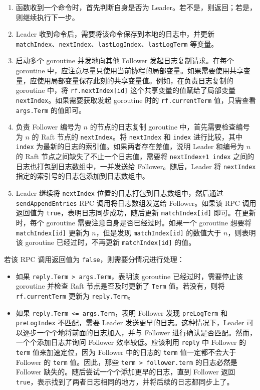 \documentclass[]{article}
\begin{document}
	\begin{enumerate}
		\item 函数收到一个命令时，首先判断自身是否为 Leader。若不是，则返回；若是，则继续执行下一步。
		
		\item Leader 收到命令后，需要将该命令保存到本地的日志中，并更新 \texttt{matchIndex}、\texttt{nextIndex}、\texttt{lastLogIndex}、\texttt{lastLogTerm} 等变量。
		
		\item 启动多个 goroutine 并发地向其他 Follower 发起日志复制请求。在每个 goroutine 中，应注意尽量只使用当前协程的局部变量。如果需要使用共享变量，应使用局部变量保存此刻的共享变量值。例如，在负责日志复制的 goroutine 中，将 \texttt{rf.nextIndex[id]} 这个共享变量的值赋给了局部变量 \texttt{nextIndex}。如果需要获取发起 goroutine 时的 \texttt{rf.currentTerm} 值，只需查看 \texttt{args.Term} 的值即可。
		
		\item 负责 Follower 编号为 $n$ 的节点的日志复制 goroutine 中，首先需要检查编号为 $n$ 的 Raft 节点的 \texttt{nextIndex}。将 \texttt{nextIndex} 和 \texttt{index} 进行比较，其中 \texttt{index} 为最新的日志的索引值。如果两者存在差值，说明 Leader 和编号为 $n$ 的 Raft 节点之间缺失了不止一个日志值，需要将 \texttt{nextIndex+1~index} 之间的日志也打包到日志数组中，一并发送给 Follower。随后，Leader 将 \texttt{nextIndex} 指定的索引号的日志包添加到日志数组中。
		
		\item Leader 继续将 \texttt{nextIndex} 位置的日志打包到日志数组中，然后通过 \texttt{sendAppendEntries} RPC 调用将日志数组发送给 Follower。如果该 RPC 调用返回值为 \texttt{true}，表明日志同步成功，随后更新 \texttt{matchIndex[id]} 即可。在更新时，每个 goroutine 需要注意自身是否已经过时。如果一个 goroutine 想要将 \texttt{matchIndex[id]} 更新为 $n$，但是发现 \texttt{matchIndex[id]} 的数值大于 $n$，则表明该 goroutine 已经过时，不再更新 \texttt{matchIndex[id]} 的值。
	\end{enumerate}
	
	若该 RPC 调用返回值为 \texttt{false}，则需要分情况进行处理：
	
	\begin{itemize}
		\item 如果 \texttt{reply.Term > args.Term}，表明该 goroutine 已经过时，需要停止该 goroutine 并检查 Raft 节点是否及时更新了 \texttt{Term} 值。若没有，则将 \texttt{rf.currentTerm} 更新为 \texttt{reply.Term}。
		
		\item 如果 \texttt{reply.Term <= args.Term}，表明 Follower 发现 \texttt{preLogTerm} 和 \texttt{preLogIndex} 不匹配，需要 Leader 发送更早的日志。这种情况下，Leader 可以逐步一个个地将前面的日志加入，并与 Follower 进行确认是否匹配。然而，一个个添加日志并询问 Follower 效率较低。应该利用 \texttt{reply} 中 Follower 的 \texttt{term} 值来加速定位，因为 Follower 中的日志的 \texttt{term} 值一定都不会大于 Follower 的 \texttt{term} 值。因此，那些 \texttt{term > follower.term} 的日志必然是 Follower 缺失的。随后尝试一个个添加更早的日志，直到 Follower 返回 \texttt{true}，表示找到了两者日志相同的地方，并将后续的日志都同步上了。
	\end{itemize}
	
\end{document}
